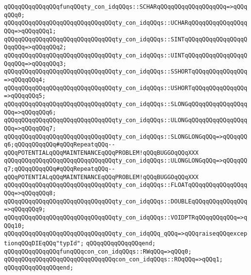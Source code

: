 \newline
\verb|qQQqqQQqqQQqqQQqfunqQQqty_con_idqQQqs::SCHARqQQqqQQqqQQqqQQqqQQq=>qQQqqQQq0;|\newline
\verb|qQQqqQQqqQQqqQQqqQQqqQQqqQQqqQQqty_con_idqQQqs::UCHARqQQqqQQqqQQqqQQqqQQq=>qQQqqQQq1;|\newline
\verb|qQQqqQQqqQQqqQQqqQQqqQQqqQQqqQQqty_con_idqQQqs::SINTqQQqqQQqqQQqqQQqqQQqqQQq=>qQQqqQQq2;|\newline
\verb|qQQqqQQqqQQqqQQqqQQqqQQqqQQqqQQqty_con_idqQQqs::UINTqQQqqQQqqQQqqQQqqQQqqQQq=>qQQqqQQq3;|\newline
\verb|qQQqqQQqqQQqqQQqqQQqqQQqqQQqqQQqty_con_idqQQqs::SSHORTqQQqqQQqqQQqqQQq=>qQQqqQQq4;|\newline
\verb|qQQqqQQqqQQqqQQqqQQqqQQqqQQqqQQqty_con_idqQQqs::USHORTqQQqqQQqqQQqqQQq=>qQQqqQQq5;|\newline
\verb|qQQqqQQqqQQqqQQqqQQqqQQqqQQqqQQqty_con_idqQQqs::SLONGqQQqqQQqqQQqqQQqqQQq=>qQQqqQQq6;|\newline
\verb|qQQqqQQqqQQqqQQqqQQqqQQqqQQqqQQqty_con_idqQQqs::ULONGqQQqqQQqqQQqqQQqqQQq=>qQQqqQQq7;|\newline
\verb|qQQqqQQqqQQqqQQqqQQqqQQqqQQqqQQqty_con_idqQQqs::SLONGLONGqQQq=>qQQqqQQq6;qQQqqQQqqQQq#qQQqRepeatqQQq--qQQqPOTENTIALqQQqMAINTENANCEqQQqPROBLEM!qQQqBUGGOqQQqXXX|\newline
\verb|qQQqqQQqqQQqqQQqqQQqqQQqqQQqqQQqty_con_idqQQqs::ULONGLONGqQQq=>qQQqqQQq7;qQQqqQQqqQQq#qQQqRepeatqQQq--qQQqPOTENTIALqQQqMAINTENANCEqQQqPROBLEM!qQQqBUGGOqQQqXXX|\newline
\verb|qQQqqQQqqQQqqQQqqQQqqQQqqQQqqQQqty_con_idqQQqs::FLOATqQQqqQQqqQQqqQQqqQQq=>qQQqqQQq8;|\newline
\verb|qQQqqQQqqQQqqQQqqQQqqQQqqQQqqQQqty_con_idqQQqs::DOUBLEqQQqqQQqqQQqqQQq=>qQQqqQQq9;|\newline
\verb|qQQqqQQqqQQqqQQqqQQqqQQqqQQqqQQqty_con_idqQQqs::VOIDPTRqQQqqQQqqQQq=>qQQq10;|\newline
\verb|qQQqqQQqqQQqqQQqqQQqqQQqqQQqqQQqty_con_idqQQq_qQQq=>qQQqraiseqQQqexceptionqQQqDIEqQQq"typId";|\newline
\verb|qQQqqQQqqQQqqQQqend;|\newline
\newline
\verb|qQQqqQQqqQQqqQQqfunqQQqcon_con_idqQQqs::RWqQQq=>qQQq0;|\newline
\verb|qQQqqQQqqQQqqQQqqQQqqQQqqQQqqQQqcon_con_idqQQqs::ROqQQq=>qQQq1;|\newline
\verb|qQQqqQQqqQQqqQQqend;|\newline
\newline
